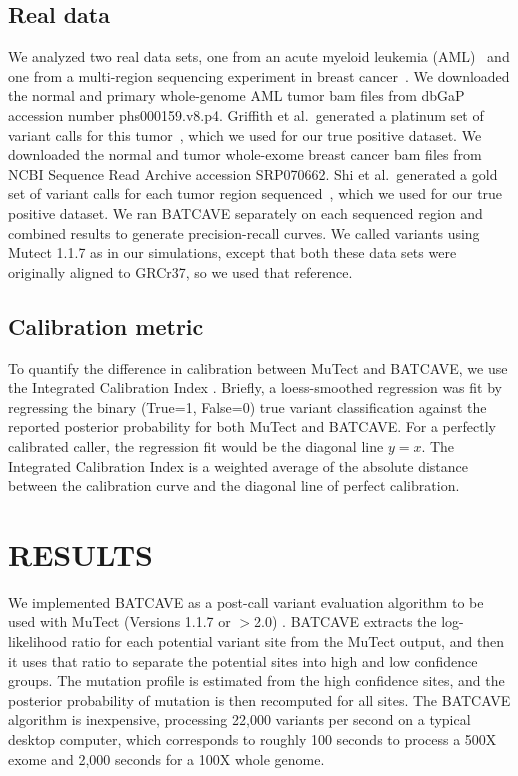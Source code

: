 \documentclass[a4,center,fleqn]{NAR}
\newcommand{\batcave}{BATCAVE\xspace}
\begin{document}
\subsection{Real data}
We analyzed two real data sets, one from an acute myeloid leukemia (AML)~\cite{Griffith2015} and one from a multi-region sequencing experiment in breast cancer~\cite{Shi2018}.
We downloaded the normal and primary whole-genome AML tumor bam files from dbGaP accession number phs000159.v8.p4.
Griffith et al.\ generated a platinum set of variant calls for this tumor~\cite{Griffith2015}, which we used for our true positive dataset.
We downloaded the normal and tumor whole-exome breast cancer bam files from NCBI Sequence Read Archive accession SRP070662.
Shi et al.\ generated a gold set of variant calls for each tumor region sequenced~\cite{Shi2018}, which we used for our true positive dataset.
We ran \batcave separately on each sequenced region and combined results to generate precision-recall curves.
We called variants using Mutect 1.1.7 as in our simulations, except that both these data sets were originally aligned to GRCr37, so we used that reference.

\subsection{Calibration metric}
To quantify the difference in calibration between MuTect and \batcave, we use the Integrated Calibration Index \cite{Austin2019}.
Briefly, a loess-smoothed regression was fit by regressing the binary (True=1, False=0) true variant classification against the reported posterior probability for both MuTect and \batcave.
For a perfectly calibrated caller, the regression fit would be the diagonal line $y=x$. 
The Integrated Calibration Index is a weighted average of the absolute distance between the calibration curve and the diagonal line of perfect calibration.

\section{RESULTS}
We implemented \batcave as a post-call variant evaluation algorithm to be used with MuTect (Versions 1.1.7 or $>$2.0) \cite{Cibulskis2013}.
\batcave extracts the log-likelihood ratio for each potential variant site from the MuTect output, and then it uses that ratio to separate the potential sites into high and low confidence groups.
The mutation profile is estimated from the high confidence sites, and the posterior probability of mutation is then recomputed for all sites.
The \batcave algorithm is inexpensive, processing 22,000 variants per second on a typical desktop computer, which corresponds to roughly 100 seconds to process a 500X exome and 2,000 seconds for a 100X whole genome.
\end{document}
